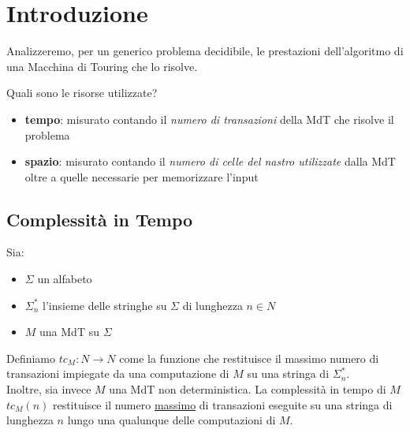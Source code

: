 \section{Introduzione}

Analizzeremo, per un generico problema decidibile, le prestazioni dell'algoritmo di una Macchina di Touring che lo risolve.

Quali sono le risorse utilizzate?

\begin{itemize}

	\item \textbf{tempo}: misurato contando il \textit{numero di transazioni} della MdT che risolve il problema

	\item \textbf{spazio}: misurato contando il \textit{numero di celle del nastro utilizzate} dalla MdT oltre a quelle necessarie per memorizzare l'input

\end{itemize}

\subsection{Complessità in Tempo}

Sia:
\begin{itemize}
	\item $\Sigma$ un alfabeto
	\item $\Sigma_n^\ast$ l'insieme delle stringhe su $\Sigma$ di lunghezza $n \in N$
	\item $M$ una MdT su $\Sigma$
\end{itemize}

Definiamo $tc_M : N \rightarrow N$ come la funzione che restituisce il massimo numero di transazioni impiegate da una computazione di $M$ su una stringa di $\Sigma_n^\ast$. \\

Inoltre, sia invece $M$ una MdT non deterministica. La complessità in tempo di $M$ $tc_M(n)$ restituisce il numero \underline{massimo} di transazioni eseguite su una stringa di lunghezza $n$ lungo una qualunque delle computazioni di $M$.
